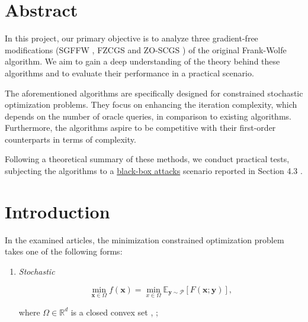  



\newpage

\begin{multicols}{2} %

\section*{Abstract}

In this project, our primary objective is to analyze three gradient-free modifications 
(SGFFW \cite{sahu19a}, FZCGS \cite{gao20b} and ZO-SCGS \cite{lobanov2023})
of the original Frank-Wolfe algorithm. We aim to gain a deep understanding of 
the theory behind these algorithms and to evaluate their performance in a
practical scenario. 

The aforementioned algorithms are specifically designed for constrained 
stochastic optimization problems. They focus on enhancing the iteration complexity, 
which depends on the number of oracle queries, in comparison to existing algorithms. 
Furthermore, the algorithms aspire to be competitive with their first-order counterparts 
in terms of complexity.

Following a theoretical summary of these methods, we conduct practical tests, 
subjecting the algorithms to a \href{https://github.com/IBM/ZOSVRG-BlackBox-Adv}{black-box attacks} 
scenario reported in Section 4.3 \cite{gao20b}.



\section{Introduction}

In the examined articles, the minimization constrained optimization 
problem takes one of the following forms:

\begin{enumerate}
    \item \textit{Stochastic} 

    \begin{equation}
    \min _{\mathbf{x} \in \Omega} f(\mathbf{x})=\min _{x \in \Omega} \mathbb{E}_{\mathbf{y} \sim \mathcal{P}}[F(\mathbf{x} ; \mathbf{y})], 
    \label{eq:stochastic}
    \end{equation}

    where $\Omega \in \mathbb{R}^d$ is a closed convex set \cite{sahu19a}, \cite{lobanov2023};
    

\end{enumerate}
\end{multicols}
